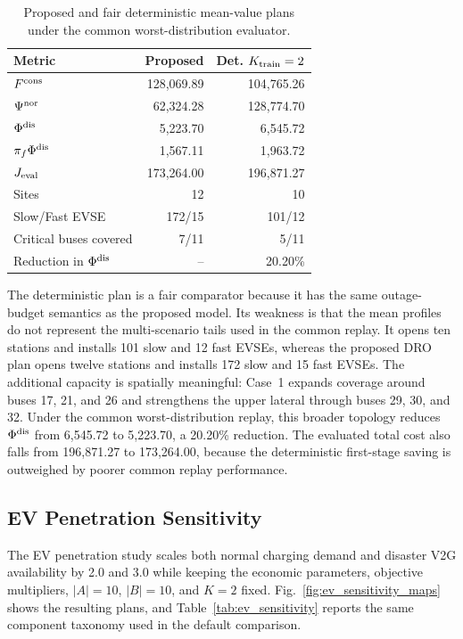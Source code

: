 \begin{table}[t]
\centering
\caption{Proposed and fair deterministic mean-value plans under the common
worst-distribution evaluator.}
\label{tab:det_worst}
\begin{tabular}{lrr}
\toprule
Metric & Proposed & Det. $K_{\rm train}=2$ \\
\midrule
$F^{\rm cons}$ & 128,069.89 & 104,765.26 \\
$\Psi^{\rm nor}$ & 62,324.28 & 128,774.70 \\
$\Phi^{\rm dis}$ & 5,223.70 & 6,545.72 \\
$\pi_f\Phi^{\rm dis}$ & 1,567.11 & 1,963.72 \\
$J_{\rm eval}$ & 173,264.00 & 196,871.27 \\
Sites & 12 & 10 \\
Slow/Fast EVSE & 172/15 & 101/12 \\
Critical buses covered & 7/11 & 5/11 \\
Reduction in $\Phi^{\rm dis}$ & -- & 20.20\% \\
\bottomrule
\end{tabular}
\end{table}

The deterministic plan is a fair comparator because it has the same
outage-budget semantics as the proposed model. Its weakness is that the mean
profiles do not represent the multi-scenario tails used in the common replay.
It opens ten stations and installs 101 slow and 12 fast EVSEs, whereas the
proposed DRO plan opens twelve stations and installs 172 slow and 15 fast
EVSEs. The additional capacity is spatially meaningful: Case~1 expands
coverage around buses 17, 21, and 26 and strengthens the upper lateral through
buses 29, 30, and 32. Under the common worst-distribution replay, this broader
topology reduces $\Phi^{\rm dis}$ from 6,545.72 to 5,223.70, a 20.20\%
reduction. The evaluated total cost also falls from 196,871.27 to 173,264.00,
because the deterministic first-stage saving is outweighed by poorer common
replay performance.

\subsection{EV Penetration Sensitivity}
The EV penetration study scales both normal charging demand and disaster V2G
availability by 2.0 and 3.0 while keeping the economic parameters, objective
multipliers, $|A|=10$, $|B|=10$, and $K=2$ fixed. Fig.~\ref{fig:ev_sensitivity_maps}
shows the resulting plans, and Table~\ref{tab:ev_sensitivity} reports the same
component taxonomy used in the default comparison.

